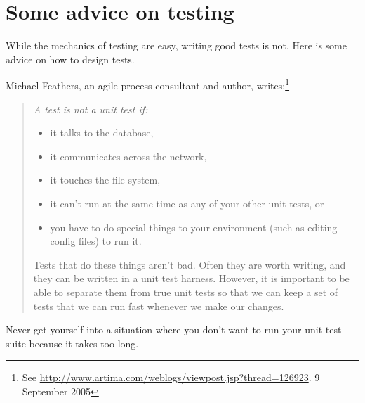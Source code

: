 \documentclass[a4paper,10pt,twoside]{book}
\begin{document}
\section{Some advice on testing}

While the mechanics of testing are easy, writing good tests is not.
Here is some advice on how to design tests.

\begin{description}


\item[Feathers' Rules for Unit tests.]
  Michael Feathers, an  agile process consultant and author, writes:\footnote{See \url{http://www.artima.com/weblogs/viewpost.jsp?thread=126923}. 9 September 2005} 
  \begin{quotation}
  \noindent
  {\it
  A test is not a unit test if:
  \begin{itemize}
	\item it talks to the database,
	\item it communicates across the network,
	\item it touches the file system,
	\item it can't run at the same time as any of your other unit tests, or
	\item you have to do special things to your environment (such as editing config files) to run it.
 \end{itemize}
Tests that do these things aren't bad. Often they are worth writing, and they can be written in a unit test harness. However, it is important to be able to separate them from true unit tests so that we can keep a set of tests that we can run fast whenever we make our changes.
 }
  \end{quotation}
Never get yourself into a situation where you don't want to run your unit test suite because it takes too long.   
 

\end{description}
\end{document}
